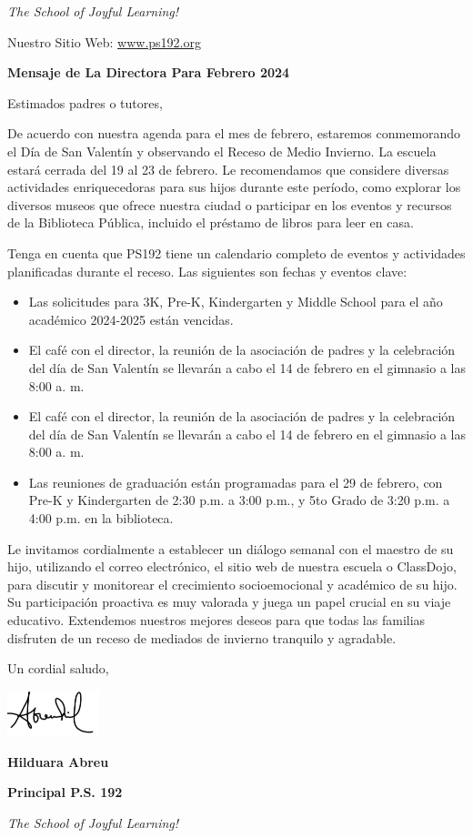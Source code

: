 \documentclass[12pt,letterpaper]{article}
\begin{document}
\textit{The School of Joyful Learning!}

\newpage
\vspace*{.5in}
Nuestro Sitio Web: \href{https://www.ps192.org}{www.ps192.org}

\textbf{Mensaje de La Directora Para Febrero 2024}

Estimados padres o tutores,

De acuerdo con nuestra agenda para el mes de febrero, estaremos conmemorando el Día de San Valentín y observando el Receso de Medio Invierno. La escuela estará cerrada del 19 al 23 de febrero. Le recomendamos que considere diversas actividades enriquecedoras para sus hijos durante este período, como explorar los diversos museos que ofrece nuestra ciudad o participar en los eventos y recursos de la Biblioteca Pública, incluido el préstamo de libros para leer en casa.
 
Tenga en cuenta que PS192 tiene un calendario completo de eventos y actividades planificadas durante el receso. Las siguientes son fechas y eventos clave:
\begin{itemize}
\item Las solicitudes para 3K, Pre-K, Kindergarten y Middle School para el año académico 2024-2025 están vencidas.
\item El café con el director, la reunión de la asociación de padres y la celebración del día de San Valentín se llevarán a cabo el 14 de febrero en el gimnasio a las 8:00 a. m.
\item El café con el director, la reunión de la asociación de padres y la celebración del día de San Valentín se llevarán a cabo el 14 de febrero en el gimnasio a las 8:00 a. m.
\item Las reuniones de graduación están programadas para el 29 de febrero, con Pre-K y Kindergarten de 2:30 p.m. a 3:00 p.m., y 5to Grado de 3:20 p.m. a 4:00 p.m. en la biblioteca.
\end{itemize}

Le invitamos cordialmente a establecer un diálogo semanal con el maestro de su hijo, utilizando el correo electrónico, el sitio web de nuestra escuela o ClassDojo, para discutir y monitorear el crecimiento socioemocional y académico de su hijo. Su participación proactiva es muy valorada y juega un papel crucial en su viaje educativo.
\newpage
\vspace*{.5in}
Extendemos nuestros mejores deseos para que todas las familias disfruten de un receso de mediados de invierno tranquilo y agradable.

Un cordial saludo,

\includegraphics[width=0.2\textwidth]{hil_signature}

\textbf{Hilduara Abreu}

\textbf{Principal P.S. 192}

\textit{The School of Joyful Learning!}
\end{document}
